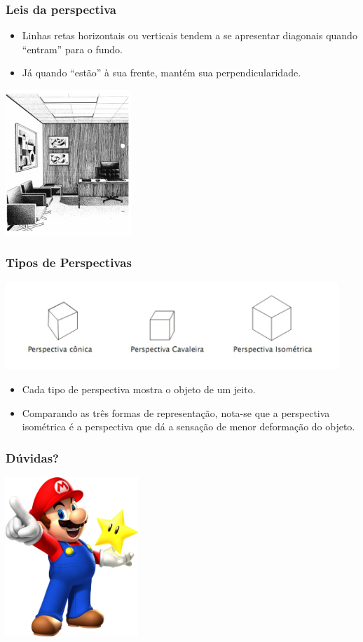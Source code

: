 \documentclass{beamer}
\begin{document}
	\begin{frame}
		\frametitle{Leis da perspectiva}
		\begin{itemize}
		\item Linhas retas horizontais ou verticais tendem a se apresentar diagonais quando “entram” para o fundo.
		\item Já quando “estão” à sua frente, mantém sua perpendicularidade.
		\end{itemize}
		\begin{center}
			\includegraphics[height=5.5cm]{foto2.jpg}
		\end{center}
	\end{frame}
	\begin{frame}
		\frametitle{Tipos de Perspectivas}
		\begin{center}
			\includegraphics[height=3.3cm]{foto3.jpg}
		\end{center}
		\begin{itemize}
		\item Cada tipo de perspectiva mostra o objeto de um jeito.
		\item Comparando as três formas de representação, nota-se que a perspectiva isométrica é a perspectiva que dá a sensação de menor deformação do objeto.
		\end{itemize}
	\end{frame}
	\begin{frame}
		\frametitle{Dúvidas?}
		\begin{center}
			\includegraphics[height=6cm]{mario.png}
		\end{center}
	\end{frame}
\end{document}
